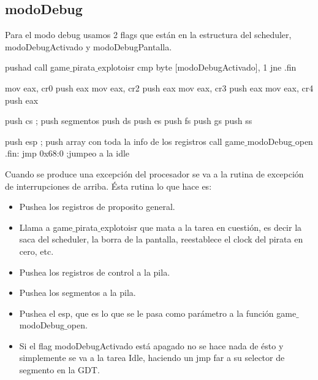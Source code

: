 \subsection{modoDebug}
Para el modo debug usamos 2 flags que están en la estructura del scheduler, modoDebugActivado y modoDebugPantalla.

\begin{algorithmic}
	\State \tab pushad
    \State \tab call game$\_$pirata$\_$explotoisr
    \State \tab cmp byte [modoDebugActivado], 1
    \State \tab jne .fin
    
    \State \tab mov eax, cr0
    \State \tab push eax
    \State \tab mov eax, cr2
    \State \tab push eax
    \State \tab mov eax, cr3
    \State \tab push eax
    \State \tab mov eax, cr4
    \State \tab push eax

    \State \tab push cs ; push segmentos
    \State \tab push ds
    \State \tab push es
    \State \tab push fs
    \State \tab push gs
    \State \tab push ss

    \State \tab push esp ; push array con toda la info de los registros
    \State \tab call game$\_$modoDebug$\_$open
  	\State .fin:
    \State \tab jmp 0x68:0 ;jumpeo a la idle\end{algorithmic}
    
Cuando se produce una excepción del procesador se va a la rutina de excepción de interrupciones de arriba.
Ésta rutina lo que hace es:
\begin{itemize}
\item Pushea los registros de proposito general.
\item Llama a game$\_$pirata$\_$explotoisr que mata a la tarea en cuestión, es decir la saca del scheduler, la borra de la pantalla, reestablece el clock del pirata en cero, etc.
\item Pushea los registros de control a la pila.
\item Pushea los segmentos a la pila.
\item Pushea el esp, que es lo que se le pasa como parámetro a la función game$\_$modoDebug$\_$open.
\item Si el flag modoDebugActivado está apagado no se hace nada de ésto y simplemente se va a la tarea Idle, haciendo un jmp far a su selector de segmento en la GDT. 
\end{itemize}

